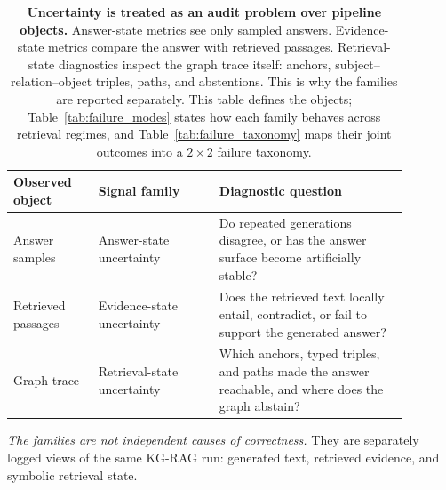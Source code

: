 
\begin{table}[t]
\centering
\small
\setlength{\tabcolsep}{5pt}
\renewcommand{\arraystretch}{1.35}
\begin{tabular}{@{}p{0.19\linewidth}p{0.27\linewidth}p{0.42\linewidth}@{}}
\toprule
\textbf{Observed object} & \textbf{Signal family} & \textbf{Diagnostic question} \\
\midrule
Answer samples
&
Answer-state uncertainty
&
Do repeated generations disagree, or has the answer surface become
artificially stable? \\
\addlinespace[0.25em]
Retrieved passages
&
Evidence-state uncertainty
&
Does the retrieved text locally entail, contradict, or fail to support the
generated answer? \\
\addlinespace[0.25em]
Graph trace
&
Retrieval-state uncertainty
&
Which anchors, typed triples, and paths made the answer reachable, and where
does the graph abstain? \\
\bottomrule
\end{tabular}

\vspace{0.45em}
\begin{minipage}{0.96\linewidth}
\footnotesize
\textit{The families are not independent causes of correctness.}
They are separately logged views of the same KG-RAG run: generated text,
retrieved evidence, and symbolic retrieval state.
\end{minipage}

\caption{%
  \textbf{Uncertainty is treated as an audit problem over pipeline objects.}
  Answer-state metrics see only sampled answers.
  Evidence-state metrics compare the answer with retrieved passages.
  Retrieval-state diagnostics inspect the graph trace itself: anchors,
  subject--relation--object triples, paths, and abstentions.
  This is why the families are reported separately.
  This table defines the objects; Table~\ref{tab:failure_modes} states how
  each family behaves across retrieval regimes, and
  Table~\ref{tab:failure_taxonomy} maps their joint outcomes into a
  $2{\times}2$ failure taxonomy.%
}
\label{tab:decomposition}
\end{table}

